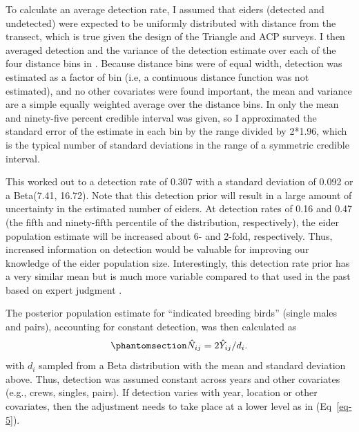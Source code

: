 \documentclass[
  10pt,
  letterpaper,
]{article}
\begin{document}
To calculate an average detection rate, I assumed that eiders (detected
and undetected) were expected to be uniformly distributed with distance
from the transect, which is true given the design of the Triangle and
ACP surveys. I then averaged detection and the variance of the detection
estimate over each of the four distance bins in . Because distance bins were of equal width, detection was estimated as a factor of bin (i.e, a continuous distance function was not estimated), and no other covariates were found important, the mean and variance are a simple equally weighted average over the distance bins. In  only the mean and ninety-five percent credible interval was given, so I approximated the standard error of the estimate in each bin by the range divided by 2*1.96, which is the typical number of standard deviations in the range of a symmetric credible interval.

This worked out to a detection rate of 0.307 with a standard deviation
of 0.092 or a Beta(7.41, 16.72). Note that this detection prior will
result in a large amount of uncertainty in the estimated number of
eiders. At detection rates of 0.16 and 0.47 (the fifth and ninety-fifth
percentile of the distribution, respectively), the eider population
estimate will be increased about 6- and 2-fold, respectively. Thus,
increased information on detection would be valuable for improving our
knowledge of the eider population size. Interestingly, this detection
rate prior has a very similar mean but is much more variable compared to
that used in the past based on expert judgment
\citep{dunham2017evaluating}.

The posterior population estimate for ``indicated breeding birds''
(single males and pairs), accounting for constant detection, was then
calculated as
\begin{equation}\phantomsection\label{eq-7}{\hat N_{ij} = 2\hat Y _{ij}/d_{i}.}\end{equation}
with \(d_i\) sampled from a Beta distribution with the mean and standard
deviation above. Thus, detection was assumed constant across years and
other covariates (e.g., crews, singles, pairs). If detection varies with
year, location or other covariates, then the adjustment needs to take
place at a lower level as in (Eq~\ref{eq-5}).
\end{document}
